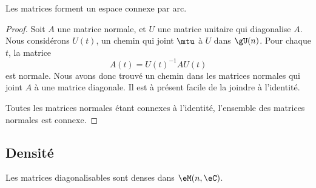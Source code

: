 \begin{theorem}
    Les matrices  forment un espace connexe par arc.
\end{theorem}

\begin{proof}
    Soit \( A\) une matrice normale, et \( U\) une matrice unitaire qui diagonalise \( A\). Nous considérons \( U(t)\), un chemin qui joint \( \mtu\) à \( U\) dans \( \gU(n)\). Pour chaque \( t\), la matrice
    \begin{equation}
        A(t)=U(t)^{-1} AU(t)
    \end{equation}
    est normale. Nous avons donc trouvé un chemin dans les matrices normales qui joint \( A\) à une matrice diagonale. Il est à présent facile de la joindre à l'identité.

    Toutes les matrices normales étant connexes à l'identité, l'ensemble des matrices normales est connexe.
\end{proof}

\subsection{Densité}

\begin{proposition}     \label{PropDigDensVxzPuo}
    Les matrices diagonalisables sont denses dans \( \eM(n,\eC)\).
\end{proposition}

